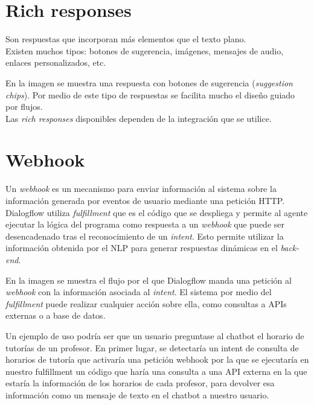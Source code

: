 \newpage

\section{Rich responses}

Son respuestas que incorporan más elementos que el texto plano.\\ 
Existen muchos tipos: botones de sugerencia, imágenes, mensajes de audio, enlaces personalizados, etc.


En la imagen se muestra una respuesta con botones de sugerencia (\textit{suggestion chips}). Por medio de este tipo de respuestas se facilita mucho el diseño guiado por flujos.\\
Las \textit{rich responses} disponibles dependen de la integración que se utilice.


\newpage

\section{Webhook}

Un \textit{webhook} es un mecanismo para enviar información al sistema sobre la información generada por eventos de usuario mediante una petición HTTP. \cite{Webhooks} \\

Dialogflow utiliza \textit{fulfillment} que es el código que se despliega y permite al agente ejecutar la lógica del programa como respuesta a un \textit{webhook} que puede ser desencadenado tras el reconocimiento de un \textit{intent}. Esto permite utilizar la información obtenida por el NLP para generar respuestas dinámicas en el \textit{back-end}. 



En la imagen se muestra el flujo por el que Dialogflow manda una petición al \textit{webhook} con la información asociada al \textit{intent}. El sistema por medio del \textit{fulfillment} puede realizar cualquier acción sobre ella, como consultas a APIs externas o a base de datos.

Un ejemplo de uso podría ser que un usuario preguntase al chatbot el horario de tutorías de un profesor. En primer lugar, se detectaría un intent de consulta de horarios de tutoría que activaría una petición webhook por la que se ejecutaría en nuestro fulfillment un código que haría una consulta a una API externa en la que estaría la información de los horarios de cada profesor, para devolver esa información como un mensaje de texto en el chatbot a nuestro usuario.


\newpage